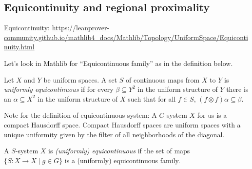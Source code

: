     



\subsection{Equicontinuity and regional proximality}

\begin{leanrmk}
    Equicontinuity: \url{https://leanprover-community.github.io/mathlib4_docs/Mathlib/Topology/UniformSpace/Equicontinuity.html}

    Let's look in Mathlib for ``Equicontinuous family'' as in the definition below.
\end{leanrmk}

\begin{definition}
     Let $X$ and $Y$ be uniform spaces.  A set $S$ of continuous maps from $X$ to $Y$ is \emph{uniformly equicontinuous} if for every $\beta \subseteq Y^2$ in the uniform structure of $Y$ there is an $\alpha \subseteq X^2$ in the uniform structure of $X$ such that for all $f \in S$, $(f \otimes f)\alpha \subseteq \beta$.
\end{definition}

Note for the definition of equicontinuous system: A $G$-system $X$ for us is a compact Hausdorff space.  Compact Hausdorff spaces are uniform spaces with a unique uniformity given by the filter of all neighborhoods of the diagonal.

\begin{definition}
    \leanok{}
    A $S$-system $X$ is \emph{(uniformly) equicontinuous} if the set of maps $\{S: X \to X \mid g \in G\}$ is a (uniformly) equicontinuous family.
\end{definition}

